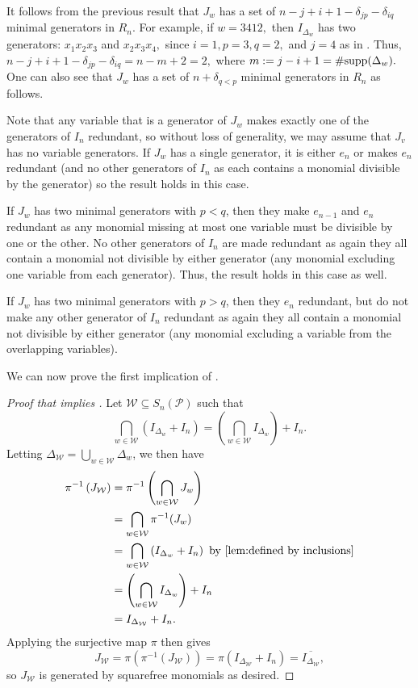 \begin{remark}
\label{rem: number of min gens of Iv}
    It follows from the previous result that $J_w$ has a set of $n-j+i+1-\delta_{jp}-\delta_{iq}$ minimal generators in $R_n$. 
    For example, if $w = 3412,$ then $I_{\Delta_w}$ has two generators: $x_1x_2x_3$ and $x_2x_3x_4,$ since $i = 1, p = 3, q = 2,$ and $j = 4$ as in . Thus, $n - j + i + 1 - \delta_{jp} - \delta_{iq} = n - m + 2 = 2,$ where $m := j - i + 1 = \#\mathrm{supp}(\Delta_w).$ One can also see that $J_w$ has a set of $n+\delta_{q<p}$ minimal generators in $R_n$ as follows.

    Note that any variable that is a generator of $J_w$ makes exactly one of the generators of $I_n$ redundant, so without loss of generality, we may assume that $J_v$ has no variable generators.
    If $J_w$ has a single generator, it is either $e_n$ or makes $e_n$ redundant (and no other generators of $I_n$ as each contains a monomial divisible by the generator) so the result holds in this case.  
    
    If $J_w$ has two minimal generators with $p<q$, then they make $e_{n-1}$ and $e_n$ redundant as any monomial missing at most one variable must be divisible by one or the other.
    No other generators of $I_n$ are made redundant as again they all contain a monomial not divisible by either generator (any monomial excluding one variable from each generator).
    Thus, the result holds in this case as well.
    
    If $J_w$ has two minimal generators with $p>q$, then they $e_n$ redundant, but do not make any other generator of $I_n$ redundant as again they all contain a monomial not divisible by either generator (any monomial excluding a variable from the overlapping variables). 
\end{remark}

We can now prove the first implication of .

\begin{proof}[Proof that  implies ]
   Let $\mathcal{W}\subseteq S_n(\mathcal{P})$ such that 
   \[\bigcap_{w\in\mathcal{W}} (I_{\Delta_w}+I_n) = \left(\bigcap_{w\in \mathcal{W}} I_{\Delta_w}\right)+I_n.\]
   Letting $\Delta_\mathcal{W} = \bigcup_{w\in\mathcal{W}}\Delta_w$, we then have 
   \begin{align*}
   \pi^{-1} \left( J_{\mathcal{W}} \right) 
   &= \pi^{-1}\left(\bigcap_{w\in\mathcal{W}} J_w\right)\\
   &= \bigcap_{w\in\mathcal{W}} \pi^{-1}(J_{w})\\
   &= \bigcap_{w\in\mathcal{W}} \left(I_{\Delta_w}+I_n\right) \text{ by \Cref{lem:defined by inclusions}}\\
   &= \left(\bigcap_{w\in\mathcal{W}} I_{\Delta_w}\right)+I_n \\
   & = I_{\Delta_\mathcal{W}}+I_n.
   \end{align*}
Applying the surjective map $\pi$ then gives 
\[J_\mathcal{W} = \pi\left(\pi^{-1}(J_{\mathcal{W}})\right) = \pi\left( I_{\Delta_\mathcal{W}}+I_n \right) = \overline{I_{\Delta_\mathcal{W}}},\]
so $J_\mathcal{W}$ is generated by squarefree monomials as desired.
\end{proof}

